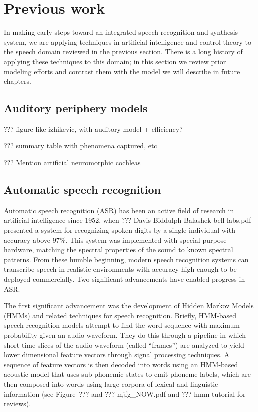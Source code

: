 \chapter{Previous work}

In making early steps toward
an integrated speech recognition and synthesis system,
we are applying techniques
in artificial intelligence and control theory
to the speech domain reviewed in the previous section.
There is a long history of applying these techniques
to this domain;
in this section we review prior modeling efforts
and contrast them with the model we will describe
in future chapters.

\section{Auditory periphery models}

??? figure like izhikevic, with auditory model + efficiency?

??? summary table with phenomena captured, etc

??? Mention artificial neuromorphic cochleas

\section{Automatic speech recognition}

Automatic speech recognition (ASR) has been
an active field of research
in artificial intelligence since 1952,
when ??? Davis Biddulph Balashek bell-labs.pdf
presented a system for recognizing
spoken digits by a single individual
with accuracy above 97\%.
This system was implemented
with special purpose hardware,
matching the spectral properties of
the sound to known spectral patterns.
From these humble beginning,
modern speech recognition systems
can transcribe speech
in realistic environments
with accuracy high enough
to be deployed commercially.
Two significant advancements
have enabled progress in ASR.

The first significant advancement
was the development of
Hidden Markov Models (HMMs)
and related techniques
for speech recognition.
Briefly,
HMM-based speech recognition models
attempt to find the word sequence
with maximum probability given
an audio waveform.
They do this through
a pipeline in which
short time-slices of the audio waveform
(called ``frames'')
are analyzed to yield lower dimensional
feature vectors
through signal processing techniques.
A sequence of feature vectors
is then decoded into words
using an HMM-based acoustic model
that uses sub-phonemic states
to emit phoneme labels,
which are then composed into words
using large corpora of
lexical and linguistic information
(see Figure~??? and ??? mjfg_NOW.pdf
and ??? hmm tutorial for reviews).

